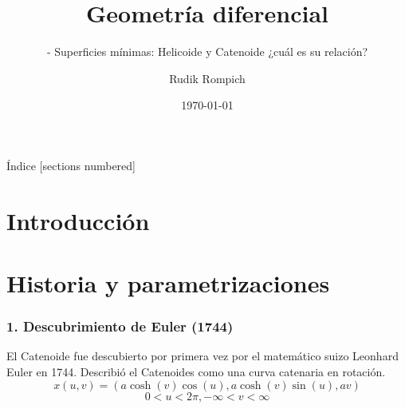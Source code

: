 \documentclass[10pt]{beamer}
\title{ Geometría diferencial}
\subtitle{ - Superficies mínimas: Helicoide y Catenoide ¿cuál es su relación?}
\author{Rudik Rompich}
\institute{Universidad del Valle de Guatemala }
\date{\today}
\begin{document}
\maketitle
\usebackgroundtemplate{}


\begin{frame}{Índice}
[sections numbered]
\tableofcontents[hideallsubsections]
\end{frame}

\section{Introducción }


\section{Historia y parametrizaciones }



    \begin{frame}
      \frametitle{1. Descubrimiento de Euler (1744)}
      El Catenoide fue descubierto por primera vez por el matemático suizo Leonhard Euler en 1744. Describió el Catenoides como una curva catenaria en rotación.
      \[x(u, v) = (a\cosh(v)\cos(u), a\cosh(v)\sin(u), av)\]
      \[ 0<u<2\pi, -\infty<v<\infty\]
    \end{frame}
\end{document}
